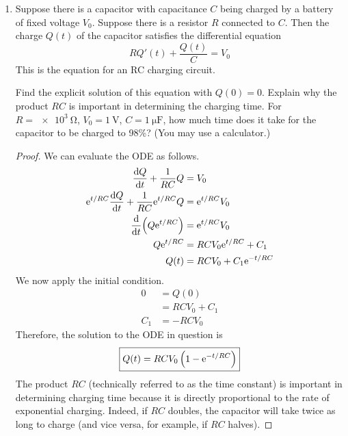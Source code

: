 \documentclass[../psets.tex]{subfiles}
\begin{document}
\begin{enumerate}
\begin{proof}
\begin{align*}
            y(t) &= w(\ln(t))\\
            &= \frac{2}{11}\e[5\ln(t)/2]-\frac{2}{11}\e[-3\ln(t)]\\
            &= \frac{2}{11}\left( \e[\ln(t)] \right)^{5/2}-\frac{2}{11}\left( \e[\ln(t)] \right)^{-3}\\
            \Aboxed{y(t) &= \frac{2}{11}t^{5/2}-\frac{2}{11}t^{-3}}
        \end{align*}
    \end{proof}
    \item Suppose there is a capacitor with capacitance $C$ being charged by a battery of fixed voltage $V_0$. Suppose there is a resistor $R$ connected to $C$. Then the charge $Q(t)$ of the capacitor satisfies the differential equation
    \begin{equation*}
        RQ'(t)+\frac{Q(t)}{C} = V_0
    \end{equation*}
    This is the equation for an RC charging circuit.\par
    Find the explicit solution of this equation with $Q(0)=0$. Explain why the product $RC$ is important in determining the charging time. For $R=\SI{e3}{\ohm}$, $V_0=\SI{1}{\volt}$, $C=\SI{1}{\micro\farad}$, how much time does it take for the capacitor to be charged to 98\%? (You may use a calculator.)
    \begin{proof}
        We can evaluate the ODE as follows.
        \begin{align*}
            \dv{Q}{t}+\frac{1}{RC}Q &= V_0\\
            \e[t/RC]\dv{Q}{t}+\frac{1}{RC}\e[t/RC]Q &= \e[t/RC]V_0\\
            \dv{t}(Q\e[t/RC]) &= \e[t/RC]V_0\\
            Q\e[t/RC] &= RCV_0\e[t/RC]+C_1\\
            Q(t) &= RCV_0+C_1\e[-t/RC]
        \end{align*}
        We now apply the initial condition.
        \begin{align*}
            0 &= Q(0)\\
            &= RCV_0+C_1\\
            C_1 &= -RCV_0
        \end{align*}
        Therefore, the solution to the ODE in question is
        \begin{equation*}
            \boxed{Q(t) = RCV_0\left( 1-\e[-t/RC] \right)}
        \end{equation*}
        The product $RC$ (technically referred to as the time constant) is important in determining charging time because it is directly proportional to the rate of exponential charging. Indeed, if $RC$ doubles, the capacitor will take twice as long to charge (and vice versa, for example, if $RC$ halves).\par

\end{proof}
\end{enumerate}
\end{document}
